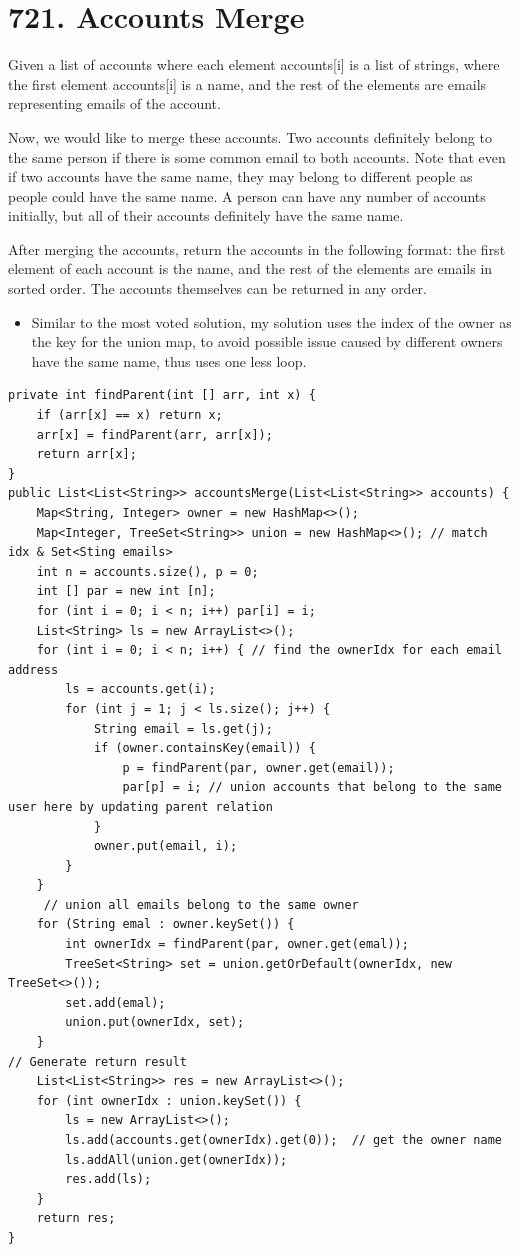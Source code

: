 \documentclass[9pt, b5paaper]{book}
\begin{document}
\section{721. Accounts Merge}
\label{sec-6-4}
Given a list of accounts where each element accounts[i] is a list of strings, where the first element accounts[i]\footnotemark[1]{} is a name, and the rest of the elements are emails representing emails of the account.

Now, we would like to merge these accounts. Two accounts definitely belong to the same person if there is some common email to both accounts. Note that even if two accounts have the same name, they may belong to different people as people could have the same name. A person can have any number of accounts initially, but all of their accounts definitely have the same name.

After merging the accounts, return the accounts in the following format: the first element of each account is the name, and the rest of the elements are emails in sorted order. The accounts themselves can be returned in any order.

\begin{itemize}
\item Similar to the most voted solution, my solution uses the index of the owner as the key for the union map, to avoid possible issue caused by different owners have the same name, thus uses one less loop.
\end{itemize}

\begin{verbatim}
private int findParent(int [] arr, int x) {
    if (arr[x] == x) return x;
    arr[x] = findParent(arr, arr[x]);
    return arr[x];
}
public List<List<String>> accountsMerge(List<List<String>> accounts) {
    Map<String, Integer> owner = new HashMap<>();
    Map<Integer, TreeSet<String>> union = new HashMap<>(); // match idx & Set<Sting emails>
    int n = accounts.size(), p = 0;
    int [] par = new int [n];
    for (int i = 0; i < n; i++) par[i] = i;
    List<String> ls = new ArrayList<>(); 
    for (int i = 0; i < n; i++) { // find the ownerIdx for each email address
        ls = accounts.get(i);
        for (int j = 1; j < ls.size(); j++) {
            String email = ls.get(j);
            if (owner.containsKey(email)) {
                p = findParent(par, owner.get(email));
                par[p] = i; // union accounts that belong to the same user here by updating parent relation
            }
            owner.put(email, i);
        }
    }
     // union all emails belong to the same owner
    for (String emal : owner.keySet()) {
        int ownerIdx = findParent(par, owner.get(emal));
        TreeSet<String> set = union.getOrDefault(ownerIdx, new TreeSet<>());
        set.add(emal);
        union.put(ownerIdx, set);
    }
// Generate return result
    List<List<String>> res = new ArrayList<>();
    for (int ownerIdx : union.keySet()) {
        ls = new ArrayList<>();
        ls.add(accounts.get(ownerIdx).get(0));  // get the owner name
        ls.addAll(union.get(ownerIdx));
        res.add(ls);
    }
    return res;
}
\end{verbatim}
\end{document}
